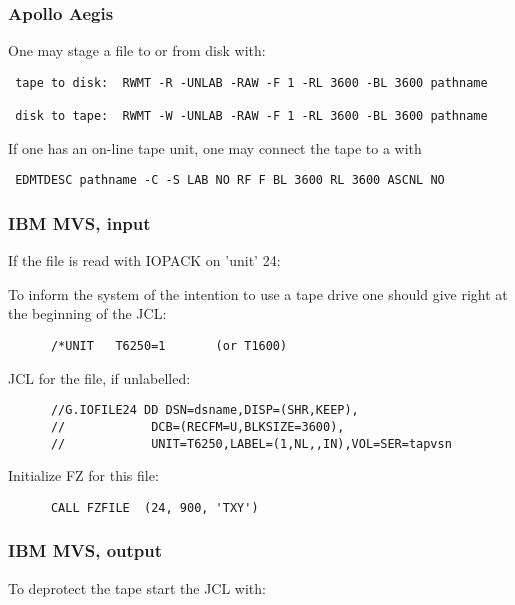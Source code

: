 \subsubsection*{Apollo Aegis}

One may stage a file to or from disk with:

\begin{verbatim}
 tape to disk:  RWMT -R -UNLAB -RAW -F 1 -RL 3600 -BL 3600 pathname

 disk to tape:  RWMT -W -UNLAB -RAW -F 1 -RL 3600 -BL 3600 pathname
\end{verbatim}

If one has an on-line tape unit, one may connect the tape
to a  with

\begin{verbatim}
 EDMTDESC pathname -C -S LAB NO RF F BL 3600 RL 3600 ASCNL NO
\end{verbatim}

\subsubsection*{IBM MVS, input}

If the file is read with IOPACK on 'unit' 24:

To inform the system of the intention to use a tape drive
one should give right at the beginning of the JCL:

\begin{verbatim}
      /*UNIT   T6250=1       (or T1600)
\end{verbatim}

JCL for the file, if unlabelled:

\begin{verbatim}
      //G.IOFILE24 DD DSN=dsname,DISP=(SHR,KEEP),
      //            DCB=(RECFM=U,BLKSIZE=3600),
      //            UNIT=T6250,LABEL=(1,NL,,IN),VOL=SER=tapvsn
\end{verbatim}

Initialize FZ for this file:

\begin{verbatim}
      CALL FZFILE  (24, 900, 'TXY')
\end{verbatim}

\subsubsection*{IBM MVS, output}

To deprotect the tape start the JCL with:

